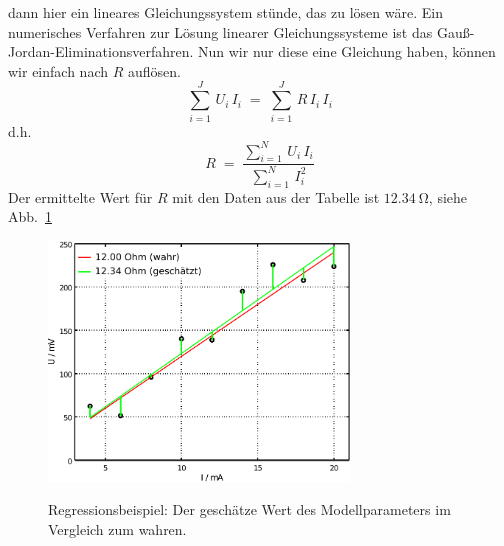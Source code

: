 dann hier ein lineares Gleichungssystem stünde, das zu lösen wäre.
Ein numerisches Verfahren zur Lösung linearer Gleichungssysteme ist das Gauß-Jordan-Eliminationsverfahren.
Nun wir nur diese eine Gleichung haben, können wir einfach nach $R$ auflösen.
\begin{equation}
\sum_{i = 1}^J \, U_i \, I_i \; = \; \sum_{i = 1}^J \, R \, I_i \, I_i
\end{equation}
d.h.
\begin{equation}
 R \; = \; \frac{\sum\limits_{i = 1}^N \, U_i \, I_i}{\sum\limits_{i = 1}^N \,  I_i^2}
\end{equation}
Der ermittelte Wert für $R$ mit den Daten aus der Tabelle ist $12.34~\mathrm{\Omega}$, siehe Abb.~\ref{OhmResult}

\begin{figure}
\begin{center}
\includegraphics[width=80mm]{01_vorlesung/media/learn_estimation_ohm_esti.pdf}
\label{OhmResult}
\caption{Regressionsbeispiel: Der geschätze Wert des Modellparameters im Vergleich zum wahren.}
\end{center}
\end{figure}

